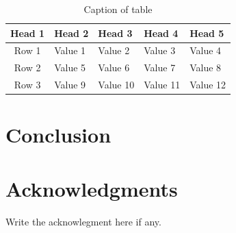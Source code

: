 \documentclass{infotel}
\begin{document}
\begin{table}
	\centering
	\caption{Caption of table}\label{tab1}
	\begin{tabular}{cllll}
		\hline
		\textbf{Head 1} & \textbf{Head 2} & \textbf{Head 3} & \textbf{Head 4} & \textbf{Head 5}\\
		\hline
		Row 1 & Value 1 & Value 2 & Value 3 & Value 4\\
		Row 2 & Value 5 & Value 6 & Value 7 & Value 8\\
	    Row 3 & Value 9 & Value 10 & Value 11 & Value 12\\
		\hline
	\end{tabular}
\end{table}










\section{Conclusion}


\section*{Acknowledgments}
Write the acknowlegment here if any.


%
%
\end{document}
